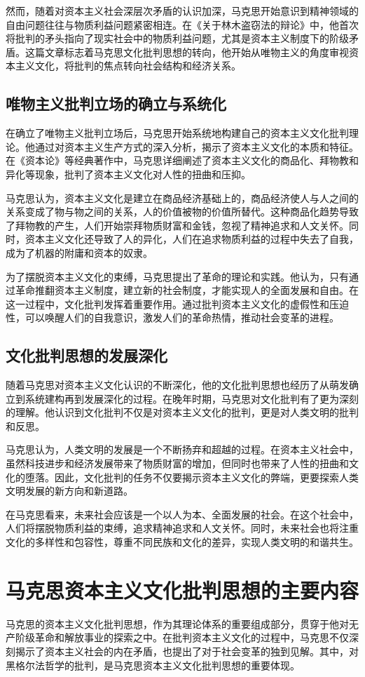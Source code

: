 然而，随着对资本主义社会深层次矛盾的认识加深，马克思开始意识到精神领域的自由问题往往与物质利益问题紧密相连。在《关于林木盗窃法的辩论》中，他首次将批判的矛头指向了现实社会中的物质利益问题，尤其是资本主义制度下的阶级矛盾。这篇文章标志着马克思文化批判思想的转向，他开始从唯物主义的角度审视资本主义文化，将批判的焦点转向社会结构和经济关系。
\subsection{唯物主义批判立场的确立与系统化}

在确立了唯物主义批判立场后，马克思开始系统地构建自己的资本主义文化批判理论。他通过对资本主义生产方式的深入分析，揭示了资本主义文化的本质和特征。在《资本论》等经典著作中，马克思详细阐述了资本主义文化的商品化、拜物教和异化等现象，批判了资本主义文化对人性的扭曲和压抑。

马克思认为，资本主义文化是建立在商品经济基础上的，商品经济使人与人之间的关系变成了物与物之间的关系，人的价值被物的价值所替代。这种商品化趋势导致了拜物教的产生，人们开始崇拜物质财富和金钱，忽视了精神追求和人文关怀。同时，资本主义文化还导致了人的异化，人们在追求物质利益的过程中失去了自我，成为了机器的附庸和资本的奴隶。

为了摆脱资本主义文化的束缚，马克思提出了革命的理论和实践。他认为，只有通过革命推翻资本主义制度，建立新的社会制度，才能实现人的全面发展和自由。在这一过程中，文化批判发挥着重要作用。通过批判资本主义文化的虚假性和压迫性，可以唤醒人们的自我意识，激发人们的革命热情，推动社会变革的进程。
\subsection{文化批判思想的发展深化}

随着马克思对资本主义文化认识的不断深化，他的文化批判思想也经历了从萌发确立到系统建构再到发展深化的过程。在晚年时期，马克思对文化批判有了更为深刻的理解。他认识到文化批判不仅是对资本主义文化的批判，更是对人类文明的批判和反思。

马克思认为，人类文明的发展是一个不断扬弃和超越的过程。在资本主义社会中，虽然科技进步和经济发展带来了物质财富的增加，但同时也带来了人性的扭曲和文化的堕落。因此，文化批判的任务不仅要揭示资本主义文化的弊端，更要探索人类文明发展的新方向和新道路。

在马克思看来，未来社会应该是一个以人为本、全面发展的社会。在这个社会中，人们将摆脱物质利益的束缚，追求精神追求和人文关怀。同时，未来社会也将注重文化的多样性和包容性，尊重不同民族和文化的差异，实现人类文明的和谐共生。
\newpage
\section{马克思资本主义文化批判思想的主要内容}
马克思的资本主义文化批判思想，作为其理论体系的重要组成部分，贯穿于他对无产阶级革命和解放事业的探索之中。在批判资本主义文化的过程中，马克思不仅深刻揭示了资本主义社会的内在矛盾，也提出了对于社会变革的独到见解。其中，对黑格尔法哲学的批判，是马克思资本主义文化批判思想的重要体现。
